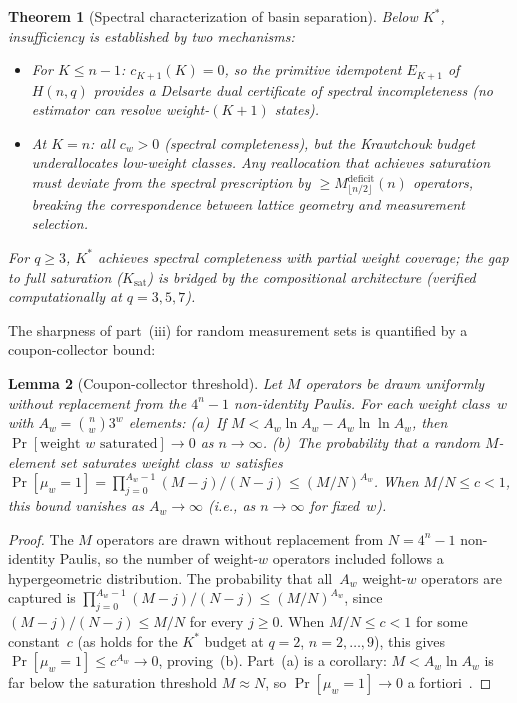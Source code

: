 \documentclass[twocolumn,prx,aps,superscriptaddress,longbibliography,floatfix]{revtex4-2}
\newtheorem{theorem}{Theorem}
\newtheorem{lemma}[theorem]{Lemma}
\newcommand{\pclaim}[4]{}
\begin{document}
\begin{theorem}[Spectral characterization of basin separation]
Below $K^*$, insufficiency is established by two
mechanisms:
\begin{itemize}
\item For $K \le n{-}1$: $c_{K+1}(K) = 0$, so the
  primitive idempotent $E_{K+1}$ of $H(n,q)$
  provides a Delsarte dual certificate of spectral
  incompleteness (no estimator can resolve
  weight-$(K{+}1)$ states).
\item At $K = n$: all $c_w > 0$ (spectral completeness),
  but the Krawtchouk budget underallocates low-weight
  classes.  Any reallocation that achieves saturation
  must deviate from the spectral prescription by
  $\ge M_{\lfloor n/2\rfloor}^{\mathrm{deficit}}(n)$
  operators, breaking the correspondence between
  lattice geometry and measurement selection.
\end{itemize}
For $q \ge 3$, $K^*$ achieves spectral completeness with partial
weight coverage; the gap to full saturation ($K_{\mathrm{sat}}$)
is bridged by the compositional architecture
(verified computationally at $q = 3, 5, 7$).
\end{theorem}

The sharpness of part~(iii) for random measurement sets
is quantified by a coupon-collector bound:

\pclaim{env:lem:coupon}{proved}{*}{lem:coupon}%
\begin{lemma}[Coupon-collector threshold]
\label{lem:coupon}
Let $M$ operators be drawn uniformly without replacement from
the $4^n - 1$ non-identity Paulis.  For each weight class~$w$
with $A_w = \binom{n}{w}3^w$ elements:
(a)~If $M < A_w \ln A_w - A_w \ln\ln A_w$, then
  $\Pr[\text{weight $w$ saturated}] \to 0$ as $n \to \infty$.
(b)~The probability that a random $M$-element set
  saturates weight class~$w$ satisfies
  $\Pr[\mu_w = 1] = \prod_{j=0}^{A_w-1}(M{-}j)/(N{-}j)
  \le (M/N)^{A_w}$.
  When $M/N \le c < 1$, this bound vanishes as
  $A_w \to \infty$ (i.e., as $n \to \infty$ for
  fixed~$w$).
\end{lemma}
\begin{proof}
The $M$ operators are drawn without replacement from
$N = 4^n - 1$ non-identity Paulis, so the number of
weight-$w$ operators included follows a hypergeometric
distribution.  The probability that all~$A_w$ weight-$w$
operators are captured is
$\prod_{j=0}^{A_w-1}(M{-}j)/(N{-}j) \le (M/N)^{A_w}$,
since $(M{-}j)/(N{-}j) \le M/N$ for every $j \ge 0$.
When $M/N \le c < 1$ for some constant~$c$
(as holds for the $K^*$ budget at $q = 2$, $n = 2, \ldots, 9$),
this gives $\Pr[\mu_w = 1] \le c^{A_w} \to 0$, proving~(b).
Part~(a) is a corollary: $M < A_w \ln A_w$ is
far below the saturation threshold $M \approx N$,
so $\Pr[\mu_w = 1] \to 0$ a
fortiori~\cite{MitzenmacherUpfal2005}.
\end{proof}
\end{document}
